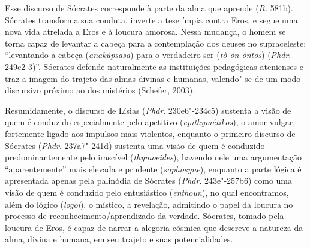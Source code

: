 Esse discurso de Sócrates corresponde à parte da alma que aprende
(\emph{R.} 581b). Sócrates transforma sua conduta, inverte a tese ímpia
contra Eros, e segue uma nova vida atrelada a Eros e à loucura amorosa.
Nessa mudança, o homem se torna capaz de levantar a cabeça para a
contemplação dos deuses no supraceleste: ``levantando a cabeça
(\emph{anakúpsasa}) para o verdadeiro ser (\emph{tò ón óntos})
(\emph{Phdr}. 249c2-3)''. Sócrates defende naturalmente as instituições
pedagógicas atenienses e traz a imagem do trajeto das almas divinas e
humanas, valendo"-se de um modo discursivo próximo ao dos mistérios
(Schefer, 2003).

 

\asterisc{}

 

Resumidamente, o discurso de Lísias (\emph{Phdr}. 230e6"-234c5) sustenta
a visão de quem é conduzido especialmente pelo apetitivo
(\emph{epithymétikos}), o amor vulgar, fortemente ligado aos impulsos
mais violentos, enquanto o primeiro discurso de Sócrates
(\emph{Phdr}. 237a7"-241d) sustenta uma visão de quem é conduzido
predominantemente pelo irascível (\emph{thymoeides}), havendo nele uma
argumentação ``aparentemente'' mais elevada e prudente
(\emph{sophosyne}), enquanto a parte lógica é apresentada apenas pela
palinódia de Sócrates (\emph{Phdr}. 243e"-257b6) como uma visão de quem é
conduzido pelo entusiástico (\emph{enthoun}), no qual encontramos, além
do lógico (\emph{logoi}), o místico, a revelação, admitindo o papel da
loucura no processo de reconhecimento/\allowbreak{}aprendizado da verdade. Sócrates,
tomado pela loucura de Eros, é capaz de narrar a alegoria cósmica que
descreve a natureza da alma, divina e humana, em seu trajeto e suas
potencialidades.

 


 
